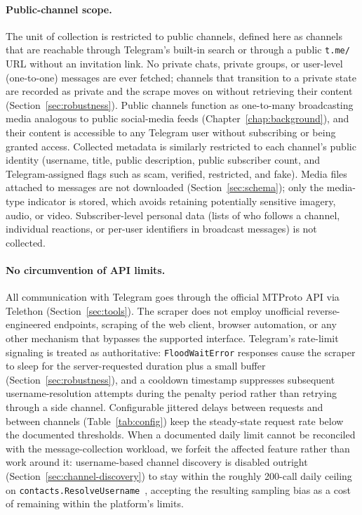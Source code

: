 \paragraph{Public-channel scope.}
The unit of collection is restricted to public channels, defined here as channels that are reachable through Telegram's built-in search or through a public \texttt{t.me/} URL without an invitation link. No private chats, private groups, or user-level (one-to-one) messages are ever fetched; channels that transition to a private state are recorded as private and the scrape moves on without retrieving their content (Section~\ref{sec:robustness}). Public channels function as one-to-many broadcasting media analogous to public social-media feeds (Chapter~\ref{chap:background}), and their content is accessible to any Telegram user without subscribing or being granted access. Collected metadata is similarly restricted to each channel's public identity (username, title, public description, public subscriber count, and Telegram-assigned flags such as scam, verified, restricted, and fake). Media files attached to messages are not downloaded (Section~\ref{sec:schema}); only the media-type indicator is stored, which avoids retaining potentially sensitive imagery, audio, or video. Subscriber-level personal data (lists of who follows a channel, individual reactions, or per-user identifiers in broadcast messages) is not collected.

\paragraph{No circumvention of API limits.}
All communication with Telegram goes through the official MTProto API via Telethon (Section~\ref{sec:tools}). The scraper does not employ unofficial reverse-engineered endpoints, scraping of the web client, browser automation, or any other mechanism that bypasses the supported interface. Telegram's rate-limit signaling is treated as authoritative: \texttt{FloodWaitError} responses cause the scraper to sleep for the server-requested duration plus a small buffer (Section~\ref{sec:robustness}), and a cooldown timestamp suppresses subsequent username-resolution attempts during the penalty period rather than retrying through a side channel. Configurable jittered delays between requests and between channels (Table~\ref{tab:config}) keep the steady-state request rate below the documented thresholds. When a documented daily limit cannot be reconciled with the message-collection workload, we forfeit the affected feature rather than work around it: username-based channel discovery is disabled outright (Section~\ref{sec:channel-discovery}) to stay within the roughly 200-call daily ceiling on \texttt{contacts.ResolveUsername}~\cite{tginfolimits}, accepting the resulting sampling bias as a cost of remaining within the platform's limits.
